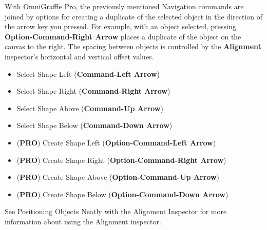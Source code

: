 \documentclass[../main.tex]{subfiles}
\begin{document}
\begin{ogpro}
  \begin{description}[style=nextline]
    \item[{Mouseless Editing (\textbf{PRO})}] With OmniGraffle Pro, the previously mentioned
      Navigation commands are joined by options for creating a duplicate of the selected object
      in the direction of the arrow key you pressed. For example, with an object selected,
      pressing \textbf{Option-Command-Right Arrow} places a duplicate of the object on the
      canvas to the right. The spacing between objects is controlled by the \textbf{Alignment}
      inspector's horizontal and vertical offset values.

      \begin{itemize}
        \item Select Shape Left (\textbf{Command-Left Arrow})
        \item Select Shape Right (\textbf{Command-Right Arrow})
        \item Select Shape Above (\textbf{Command-Up Arrow})
        \item Select Shape Below (\textbf{Command-Down Arrow})
        \item (\textbf{PRO}) Create Shape Left (\textbf{Option-Command-Left Arrow})
        \item (\textbf{PRO}) Create Shape Right (\textbf{Option-Command-Right Arrow})
        \item (\textbf{PRO}) Create Shape Above (\textbf{Option-Command-Up Arrow})
        \item (\textbf{PRO}) Create Shape Below (\textbf{Option-Command-Down Arrow})
      \end{itemize}

      See Positioning Objects Neatly with the Alignment Inspector for more information about using
      the Alignment inspector.
  \end{description}
\end{ogpro}
\end{document}
